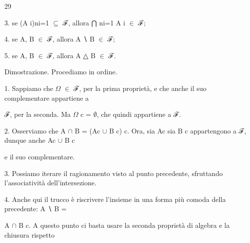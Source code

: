 \documentclass[a4paper,portrait,12pt]{article}
\begin{document}
29





\begin{flushleft}
3. se (A i)ni=1 $\subseteq$ ℱ, allora ⋂ ni=1 A i $\in$ ℱ;
\end{flushleft}


\begin{flushleft}
4. se A, B $\in$ ℱ, allora A ∖ B $\in$ ℱ;
\end{flushleft}


\begin{flushleft}
5. se A, B $\in$ ℱ, allora A △ B $\in$ ℱ.
\end{flushleft}


\begin{flushleft}
Dimostrazione. Procediamo in ordine.
\end{flushleft}


\begin{flushleft}
1. Sappiamo che $\Omega$ $\in$ ℱ, per la prima propriet\`{a}, e che anche il suo complementare appartiene a
\end{flushleft}


\begin{flushleft}
ℱ, per la seconda. Ma $\Omega$ c = $\emptyset$, che quindi appartiene a ℱ.
\end{flushleft}


\begin{flushleft}
2. Osserviamo che A $\cap$ B = (Ac $\cup$ B c) c. Ora, sia Ac sia B c appartengono a ℱ, dunque anche Ac $\cup$ B c
\end{flushleft}


\begin{flushleft}
e il suo complementare.
\end{flushleft}


\begin{flushleft}
3. Possiamo iterare il ragionamento visto al punto precedente, sfruttando l'associativit\`{a} dell'intersezione.
\end{flushleft}


\begin{flushleft}
4. Anche qui il trucco \`{e} riscrivere l'insieme in una forma più comoda della precedente: A ∖ B =
\end{flushleft}


\begin{flushleft}
A $\cap$ B c. A questo punto ci basta usare la seconda propriet\`{a} di algebra e la chiusura rispetto
\end{flushleft}
\end{document}
